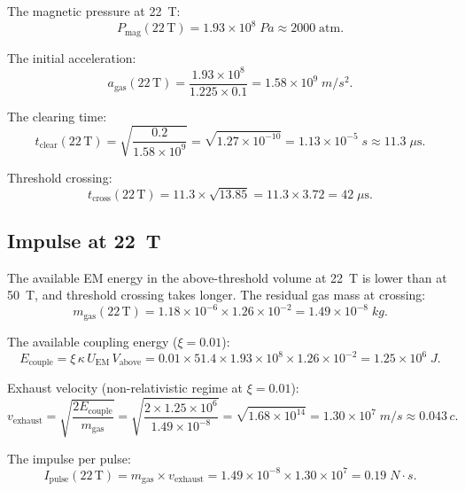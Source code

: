 \documentclass[amsmath,amssymb,aps,prd,superscriptaddress,nofootinbib]{revtex4-2}
\newcommand{\ka}{\kappa}
\begin{document}
The magnetic pressure at 22~T:
\begin{equation}
P_\text{mag}(22\,\text{T}) = 1.93 \times 10^8 \; \si{Pa}
\approx 2000 \; \text{atm}.
\end{equation}

The initial acceleration:
\begin{equation}
a_\text{gas}(22\,\text{T}) = \frac{1.93 \times 10^8}{1.225 \times 0.1}
= 1.58 \times 10^{9} \; \si{m/s^2}.
\end{equation}

The clearing time:
\begin{equation}
t_\text{clear}(22\,\text{T}) = \sqrt{\frac{0.2}{1.58 \times 10^9}}
= \sqrt{1.27 \times 10^{-10}}
= 1.13 \times 10^{-5} \; \si{s}
\approx 11.3 \; \mu\text{s}.
\end{equation}

Threshold crossing:
\begin{equation}
t_\text{cross}(22\,\text{T}) = 11.3 \times \sqrt{13.85}
= 11.3 \times 3.72 = 42 \; \mu\text{s}.
\end{equation}

\subsection{Impulse at 22~T}

The available EM energy in the above-threshold volume at 22~T is lower
than at 50~T, and threshold crossing takes longer. The residual gas
mass at crossing:
\begin{equation}
m_\text{gas}(22\,\text{T}) = 1.18 \times 10^{-6} \times 1.26 \times 10^{-2}
= 1.49 \times 10^{-8} \; \si{kg}.
\end{equation}

The available coupling energy ($\xi = 0.01$):
\begin{equation}
E_\text{couple} = \xi \, \ka \, U_\text{EM} \, V_\text{above}
= 0.01 \times 51.4 \times 1.93 \times 10^8 \times 1.26 \times 10^{-2}
= 1.25 \times 10^6 \; \si{J}.
\end{equation}

Exhaust velocity (non-relativistic regime at $\xi = 0.01$):
\begin{equation}
v_\text{exhaust} = \sqrt{\frac{2 E_\text{couple}}{m_\text{gas}}}
= \sqrt{\frac{2 \times 1.25 \times 10^6}{1.49 \times 10^{-8}}}
= \sqrt{1.68 \times 10^{14}}
= 1.30 \times 10^7 \; \si{m/s}
\approx 0.043\,c.
\end{equation}

The impulse per pulse:
\begin{equation}
I_\text{pulse}(22\,\text{T}) = m_\text{gas} \times v_\text{exhaust}
= 1.49 \times 10^{-8} \times 1.30 \times 10^7
= 0.19 \; \si{N \cdot s}.
\end{equation}
\end{document}
